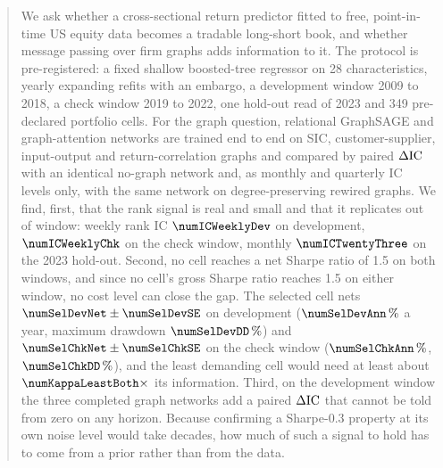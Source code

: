 \begin{abstract}
\noindent
We ask whether a cross-sectional return predictor fitted to free, point-in-time US equity data becomes a tradable long-short book, and whether message passing over firm graphs adds information to it. The protocol is pre-registered: a fixed shallow boosted-tree regressor on 28 characteristics, yearly expanding refits with an embargo, a development window 2009 to 2018, a check window 2019 to 2022, one hold-out read of 2023 and 349 pre-declared portfolio cells. For the graph question, relational GraphSAGE and graph-attention networks are trained end to end on SIC, customer-supplier, input-output and return-correlation graphs and compared by paired $\Delta\IC$ with an identical no-graph network and, as monthly and quarterly IC levels only, with the same network on degree-preserving rewired graphs. We find, first, that the rank signal is real and small and that it replicates out of window: weekly rank IC $\numICWeeklyDev$ on development, $\numICWeeklyChk$ on the check window, monthly $\numICTwentyThree$ on the 2023 hold-out. Second, no cell reaches a net Sharpe ratio of 1.5 on both windows, and since no cell's gross Sharpe ratio reaches 1.5 on either window, no cost level can close the gap. The selected cell nets $\numSelDevNet\pm\numSelDevSE$ on development ($\numSelDevAnn\pct$ a year, maximum drawdown $\numSelDevDD\pct$) and $\numSelChkNet\pm\numSelChkSE$ on the check window ($\numSelChkAnn\pct$, $\numSelChkDD\pct$), and the least demanding cell would need at least about $\numKappaLeastBoth\times$ its information. Third, on the development window the three completed graph networks add a paired $\Delta\IC$ that cannot be told from zero on any horizon. Because confirming a Sharpe-0.3 property at its own noise level would take decades, how much of such a signal to hold has to come from a prior rather than from the data.
\end{abstract}
